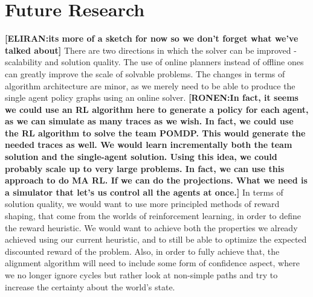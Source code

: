 \documentclass[letterpaper]{article} %
\newcommand{\eliran}[1]{\textbf{[\color{red}ELIRAN:#1]}}
\newcommand{\ronen}[1]{\textbf{[\color{blue}RONEN:#1]}}
\begin{document}
\section{Future Research}
\eliran{its more of a sketch for now so we don't forget what we've talked about}
There are two directions in which the solver can be improved -  scalability and solution quality.
The use of online planners instead of offline ones can greatly improve the scale of solvable problems. The changes in terms of algorithm architecture are minor, as we merely need to be able to produce the single agent policy graphs using an online solver. \ronen{In fact, it seems we could use an RL algorithm here to generate a policy for each agent, as we can simulate as many traces as we wish.
In fact, we could use the RL algorithm to solve the team POMDP. This would generate the needed traces as well. We would learn incrementally
both the team solution and the single-agent solution. Using this idea, we could probably scale up to very large problems. In fact, we can use this
approach to do MA RL. If we can do the projections. What we need is a simulator that let's us control all the agents at once.}
In terms of solution quality, we would want to use more principled methods of reward shaping, that come from the worlds of reinforcement learning, in order to define the reward heuristic. We would want to achieve both the properties we already achieved using our current heuristic, and to still be able to optimize the expected discounted reward of the problem.
Also, in order to fully achieve that, the alignment algorithm will need to include some form of confidence aspect, where we no longer ignore cycles but rather look at non-simple paths and try to increase the certainty about the world's state. 



\end{document}
